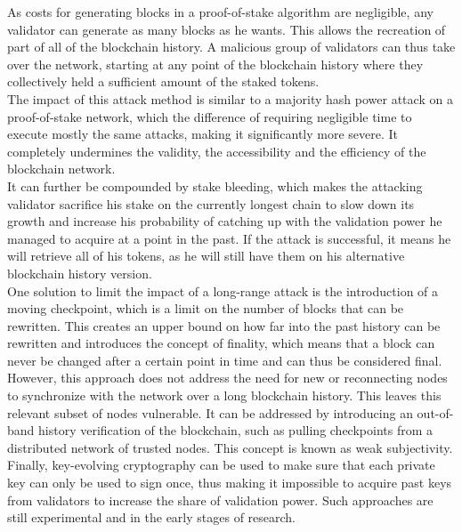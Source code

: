 \documentclass[12pt,a4paper]{article}
\begin{document}
As costs for generating blocks in a proof-of-stake algorithm are negligible, any validator can generate as many blocks as he wants. This allows the recreation of part of all of the blockchain history. A malicious group of validators can thus take over the network, starting at any point of the blockchain history where they collectively held a sufficient amount of the staked tokens.\\

The impact of this attack method is similar to a majority hash power attack on a proof-of-stake network, which the difference of requiring negligible time to execute mostly the same attacks, making it significantly more severe. It completely undermines the validity, the accessibility and the efficiency of the blockchain network.\\

It can further be compounded by stake bleeding, which makes the attacking validator sacrifice his stake on the currently longest chain to slow down its growth and increase his probability of catching up with the validation power he managed to acquire at a point in the past. If the attack is successful, it means he will retrieve all of his tokens, as he will still have them on his alternative blockchain history version.\\

One solution to limit the impact of a long-range attack is the introduction of a moving checkpoint, which is a limit on the number of blocks that can be rewritten. This creates an upper bound on how far into the past history can be rewritten and introduces the concept of finality, which means that a block can never be changed after a certain point in time and can thus be considered final.\\

However, this approach does not address the need for new or reconnecting nodes to synchronize with the network over a long blockchain history. This leaves this relevant subset of nodes vulnerable. It can be addressed by introducing an out-of-band history verification of the blockchain, such as pulling checkpoints from a distributed network of trusted nodes. This concept is known as weak subjectivity.\\

Finally, key-evolving cryptography can be used to make sure that each private key can only be used to sign once, thus making it impossible to acquire past keys from validators to increase the share of validation power. Such approaches are still experimental and in the early stages of research.\\
\end{document}
